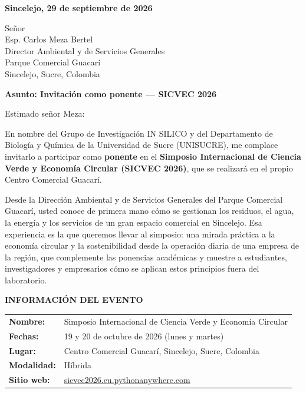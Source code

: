 \documentclass[11pt,a4paper]{article}
\begin{document}
\vspace{0.1cm}

\noindent
\textbf{Sincelejo, 29 de septiembre de 2026}

\vspace{0.1cm}

\noindent
Señor\\
Esp. Carlos Meza Bertel\\
Director Ambiental y de Servicios Generales\\
Parque Comercial Guacarí\\
Sincelejo, Sucre, Colombia

\vspace{0.1cm}

\noindent
\textbf{\large Asunto: Invitación como ponente — SICVEC 2026}

\vspace{0.1cm}

Estimado señor Meza:

\vspace{0.1cm}

En nombre del Grupo de Investigación IN SILICO y del Departamento de Biología y Química de la Universidad de Sucre (UNISUCRE), me complace invitarlo a participar como \textbf{ponente} en el \textbf{Simposio Internacional de Ciencia Verde y Economía Circular (SICVEC 2026)}, que se realizará en el propio Centro Comercial Guacarí.

Desde la Dirección Ambiental y de Servicios Generales del Parque Comercial Guacarí, usted conoce de primera mano cómo se gestionan los residuos, el agua, la energía y los servicios de un gran espacio comercial en Sincelejo. Esa experiencia es la que queremos llevar al simposio: una mirada práctica a la economía circular y la sostenibilidad desde la operación diaria de una empresa de la región, que complemente las ponencias académicas y muestre a estudiantes, investigadores y empresarios cómo se aplican estos principios fuera del laboratorio.

\vspace{0.1cm}

\noindent
\textbf{INFORMACIÓN DEL EVENTO}

\begin{tabular}{ll}
\textbf{Nombre:} & Simposio Internacional de Ciencia Verde y Economía Circular \\
\textbf{Fechas:} & 19 y 20 de octubre de 2026 (lunes y martes) \\
\textbf{Lugar:} & Centro Comercial Guacarí, Sincelejo, Sucre, Colombia \\
\textbf{Modalidad:} & Híbrida \\
\textbf{Sitio web:} & \href{https://sicvec2026.eu.pythonanywhere.com}{sicvec2026.eu.pythonanywhere.com} \\
\end{tabular}
\end{document}
